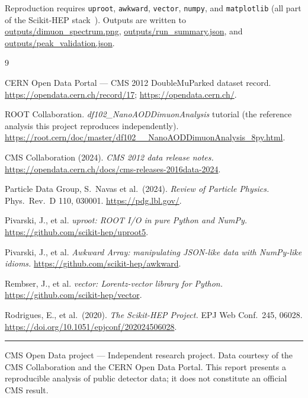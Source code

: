 \documentclass[11pt,a4paper]{article}
\begin{document}
Reproduction requires \texttt{uproot}, \texttt{awkward}, \texttt{vector}, \texttt{numpy}, and
\texttt{matplotlib} (all part of the Scikit-HEP stack~\cite{scikit-hep}). Outputs are written to
\url{outputs/dimuon_spectrum.png}, \url{outputs/run_summary.json}, and
\url{outputs/peak_validation.json}.

\begin{thebibliography}{9}

 CERN Open Data Portal --- CMS 2012 DoubleMuParked dataset record.
  \url{https://opendata.cern.ch/record/17}; \url{https://opendata.cern.ch/}.

 ROOT Collaboration. \emph{df102\_NanoAODDimuonAnalysis} tutorial (the
  reference analysis this project reproduces independently).
  \url{https://root.cern/doc/master/df102__NanoAODDimuonAnalysis_8py.html}.

 CMS Collaboration (2024). \emph{CMS 2012 data release notes.}
  \url{https://opendata.cern.ch/docs/cms-releases-2016data-2024}.

 Particle Data Group, S.\ Navas et al.\ (2024). \emph{Review of Particle
  Physics.} Phys.\ Rev.\ D 110, 030001. \url{https://pdg.lbl.gov/}.

 Pivarski, J., et al. \emph{uproot: ROOT I/O in pure Python and NumPy.}
  \url{https://github.com/scikit-hep/uproot5}.

 Pivarski, J., et al. \emph{Awkward Array: manipulating JSON-like data with
  NumPy-like idioms.} \url{https://github.com/scikit-hep/awkward}.

 Rembser, J., et al. \emph{vector: Lorentz-vector library for Python.}
  \url{https://github.com/scikit-hep/vector}.

 Rodrigues, E., et al.\ (2020). \emph{The Scikit-HEP Project.} EPJ Web
  Conf.\ 245, 06028. \url{https://doi.org/10.1051/epjconf/202024506028}.

\end{thebibliography}

\vspace{1cm}
\noindent\rule{\textwidth}{0.4pt}

\vspace{0.3cm}
\footnotesize
\noindent CMS Open Data project --- Independent research project. Data courtesy of the CMS
Collaboration and the CERN Open Data Portal. This report presents a reproducible analysis of
public detector data; it does not constitute an official CMS result.
\end{document}
